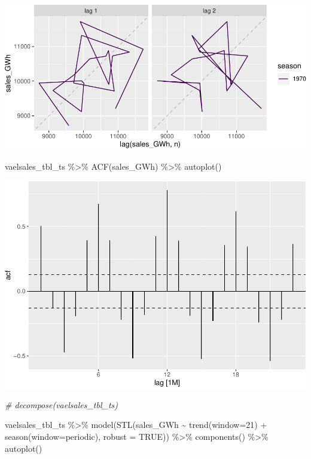 \documentclass[
]{book}
\newenvironment{Shaded}{\begin{snugshade}}{\end{snugshade}}
\newcommand{\AttributeTok}[1]{\textcolor[rgb]{0.77,0.63,0.00}{#1}}
\newcommand{\CommentTok}[1]{\textcolor[rgb]{0.56,0.35,0.01}{\textit{#1}}}
\newcommand{\ConstantTok}[1]{\textcolor[rgb]{0.00,0.00,0.00}{#1}}
\newcommand{\DecValTok}[1]{\textcolor[rgb]{0.00,0.00,0.81}{#1}}
\newcommand{\FunctionTok}[1]{\textcolor[rgb]{0.00,0.00,0.00}{#1}}
\newcommand{\NormalTok}[1]{#1}
\newcommand{\SpecialCharTok}[1]{\textcolor[rgb]{0.00,0.00,0.00}{#1}}
\newcommand{\StringTok}[1]{\textcolor[rgb]{0.31,0.60,0.02}{#1}}
\begin{document}
\includegraphics{graphics/plot lagged values-2.pdf}

\begin{Shaded}
\begin{Highlighting}[]
\NormalTok{vaelsales\_tbl\_ts }\SpecialCharTok{\%\textgreater{}\%} \FunctionTok{ACF}\NormalTok{(sales\_GWh) }\SpecialCharTok{\%\textgreater{}\%} \FunctionTok{autoplot}\NormalTok{()}
\end{Highlighting}
\end{Shaded}

\includegraphics{graphics/unnamed-chunk-49-1.pdf}

\begin{Shaded}
\begin{Highlighting}[]
\CommentTok{\# decompose(vaelsales\_tbl\_ts)}
\end{Highlighting}
\end{Shaded}

\begin{Shaded}
\begin{Highlighting}[]
\NormalTok{vaelsales\_tbl\_ts }\SpecialCharTok{\%\textgreater{}\%}
  \FunctionTok{model}\NormalTok{(}\FunctionTok{STL}\NormalTok{(sales\_GWh }\SpecialCharTok{\textasciitilde{}} \FunctionTok{trend}\NormalTok{(}\AttributeTok{window=}\DecValTok{21}\NormalTok{) }\SpecialCharTok{+} \FunctionTok{season}\NormalTok{(}\AttributeTok{window=}\StringTok{\textquotesingle{}periodic\textquotesingle{}}\NormalTok{), }\AttributeTok{robust =} \ConstantTok{TRUE}\NormalTok{)) }\SpecialCharTok{\%\textgreater{}\%}
  \FunctionTok{components}\NormalTok{() }\SpecialCharTok{\%\textgreater{}\%}
  \FunctionTok{autoplot}\NormalTok{()}
\end{Highlighting}
\end{Shaded}
\end{document}
